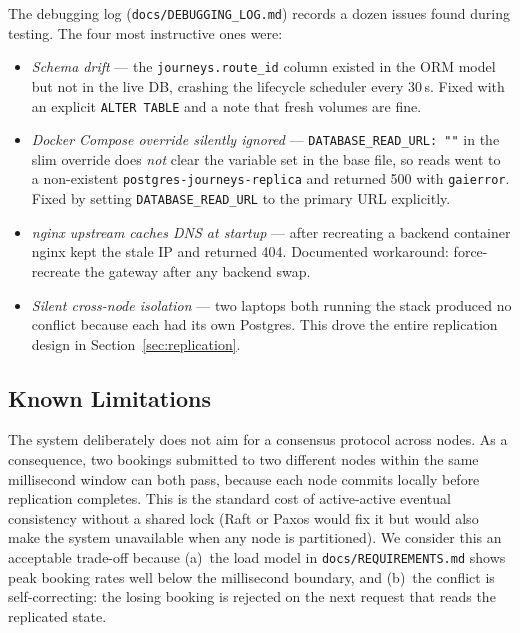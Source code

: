 \documentclass[12pt,a4paper]{article}
\begin{document}
The debugging log (\texttt{docs/DEBUGGING\_LOG.md}) records a dozen issues found during testing. The four most instructive ones were:

\begin{itemize}
  \item \emph{Schema drift} --- the \texttt{journeys.route\_id} column
        existed in the ORM model but not in the live DB, crashing the
        lifecycle scheduler every 30\,s. Fixed with an explicit
        \texttt{ALTER TABLE} and a note that fresh volumes are fine.
  \item \emph{Docker Compose override silently ignored} ---
        \texttt{DATABASE\_READ\_URL: ""} in the slim override does
        \emph{not} clear the variable set in the base file, so reads
        went to a non-existent \texttt{postgres-journeys-replica} and
        returned 500 with \texttt{gaierror}. Fixed by setting
        \texttt{DATABASE\_READ\_URL} to the primary URL explicitly.
  \item \emph{nginx upstream caches DNS at startup} --- after
        recreating a backend container nginx kept the stale IP and
        returned 404. Documented workaround: force-recreate the
        gateway after any backend swap.
  \item \emph{Silent cross-node isolation} --- two laptops both running
        the stack produced no conflict because each had its own
        Postgres. This drove the entire replication design in
        Section~\ref{sec:replication}.
\end{itemize}

\subsection{Known Limitations}

The system deliberately does not aim for a consensus protocol across nodes. As a consequence, two bookings submitted to two different nodes within the same millisecond window can both pass, because each node commits locally before replication completes. This is the standard cost of active-active eventual consistency without a shared lock (Raft or Paxos would fix it but would also make the system unavailable when any node is partitioned). We consider this an acceptable trade-off because (a)~the load model in \texttt{docs/REQUIREMENTS.md} shows peak booking rates well below the millisecond boundary, and (b)~the conflict is self-correcting: the losing booking is rejected on the next request that reads the replicated state.
\end{document}
